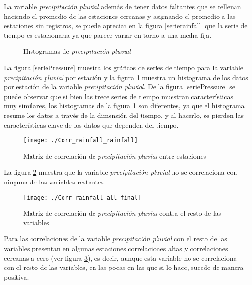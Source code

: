 La variable {\em precipitación pluvial} además de tener datos faltantes que se rellenan haciendo el promedio de las estaciones cercanas y asignando el promedio a las estaciones sin registros, se puede apreciar en la figura \ref{serierainfall} que la serie de tiempo es estacionaria ya que parece variar en torno a una media fija.

\begin{figure}[H]
\centering
{}
\caption{Histogramas de {\em precipitación pluvial} }
\label{histPressure}
\end{figure}

La figura \ref{seriePressure} muestra los gráficos de series de tiempo para la variable {\em precipitación pluvial} por estación y la figura \ref{histPressure} muestra un histograma de los datos por estación de la variable {\em precipitación pluvial}. De la figura \ref{seriePressure} se puede observar que si bien las trece series de tiempo muestran características muy similares, los histogramas de la figura \ref{histPressure} son diferentes, ya que el histograma resume los datos a través de la dimensión del tiempo, y al hacerlo, se pierden las características clave de los datos que dependen del tiempo.

\begin{figure}[H]
\centering
\texttt{[image: ./Corr\_rainfall\_rainfall]}
\caption{Matriz de correlación de {\em precipitación pluvial} entre estaciones }
\label{corrrainfall2}
\end{figure}

La figura \ref{corrrainfall2} muestra que la variable {\em precipitación pluvial} no se correlaciona con ninguna de las variables restantes.

\begin{figure}[H]
\centering
\texttt{[image: ./Corr\_rainfall\_all\_final]}
\caption{Matriz de correlación de {\em precipitación pluvial} contra el resto de las variables}
\label{corrrainfall}
\end{figure}


Para las correlaciones de la variable {\em precipitación pluvial} con el resto de las variables presentan en algunas estaciones correlaciones altas y correlaciones cercanas a cero (ver figura \ref{corrrainfall}), es decir, aunque esta variable no se correlaciona con el resto de las variables, en las pocas en las que si lo hace, sucede de manera positiva.




